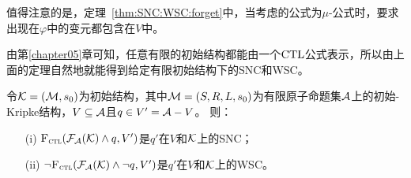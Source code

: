 值得注意的是，定理~\ref{thm:SNC:WSC:forget}中，当考虑的公式为$\mu$-公式时，要求出现在$\varphi$中的变元都包含在$V$中。

由第\ref{chapter05}章可知，任意有限的初始结构都能由一个$\textrm{CTL}$公式表示，所以由上面的定理自然地就能得到给定有限初始结构下的SNC和WSC。
\begin{corollary}\label{thm:inK:SNC}
	令${\cal K}= ({\cal M}, s_0)$为初始结构，其中${\cal M}=(S,R,L,s_0)$为有限原子命题集${\cal A}$上的初始-Kripke结构，$V \subseteq {\cal A}$且$q\in V' = {\cal A} - V$。 则：
	\begin{itemize}
		\item[(i)] ${\textsc{F}_{\textsc{ctl}}}({\cal F}_{{\cal A}}({\cal K}) \wedge q, V')$是$q'$在$V$和${\cal K}$上的SNC；
		\item[(ii)] $\neg {\textsc{F}_{\textsc{ctl}}}({\cal F}_{{\cal A}}({\cal K}) \wedge \neg q, V')$是$q'$在$V$和${\cal K}$上的WSC。
	\end{itemize}
\end{corollary}

